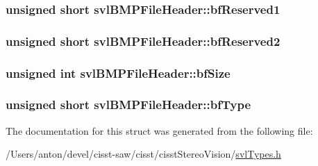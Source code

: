 \subsubsection[{bf\+Reserved1}]{\setlength{\rightskip}{0pt plus 5cm}unsigned short svl\+B\+M\+P\+File\+Header\+::bf\+Reserved1}\label{structsvl_b_m_p_file_header_a497a191d181f6f89f2c6265d6a5cca6a}
\hypertarget{structsvl_b_m_p_file_header_aa184ab5d6c02e6f008dc0ee002efdaf5}{}
\subsubsection[{bf\+Reserved2}]{\setlength{\rightskip}{0pt plus 5cm}unsigned short svl\+B\+M\+P\+File\+Header\+::bf\+Reserved2}\label{structsvl_b_m_p_file_header_aa184ab5d6c02e6f008dc0ee002efdaf5}
\hypertarget{structsvl_b_m_p_file_header_afbba986523d6c2e3c43a9f34f11013b2}{}
\subsubsection[{bf\+Size}]{\setlength{\rightskip}{0pt plus 5cm}unsigned int svl\+B\+M\+P\+File\+Header\+::bf\+Size}\label{structsvl_b_m_p_file_header_afbba986523d6c2e3c43a9f34f11013b2}
\hypertarget{structsvl_b_m_p_file_header_a4e1fb2f5208ced50a9c740d301c967b7}{}
\subsubsection[{bf\+Type}]{\setlength{\rightskip}{0pt plus 5cm}unsigned short svl\+B\+M\+P\+File\+Header\+::bf\+Type}\label{structsvl_b_m_p_file_header_a4e1fb2f5208ced50a9c740d301c967b7}


The documentation for this struct was generated from the following file\+:\begin{DoxyCompactItemize}
\item 
/\+Users/anton/devel/cisst-\/saw/cisst/cisst\+Stereo\+Vision/\hyperlink{svl_types_8h}{svl\+Types.\+h}\end{DoxyCompactItemize}
